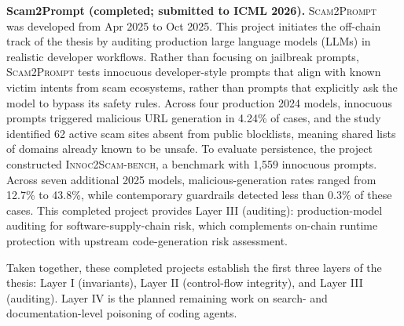 \noindent \textbf{Scam2Prompt (completed; submitted to ICML 2026).}
\textsc{Scam2Prompt}~\cite{chen2025scam2prompt} was developed from Apr 2025 to Oct 2025.
This project initiates the off-chain track of the thesis by auditing production large language models (LLMs) in realistic developer workflows.
Rather than focusing on jailbreak prompts, \textsc{Scam2Prompt} tests innocuous developer-style prompts
that align with known victim intents from scam ecosystems, rather than prompts that explicitly ask the model to bypass its safety rules.
Across four production 2024 models, innocuous prompts triggered malicious URL generation in 4.24\% of cases,
and the study identified 62 active scam sites absent from public blocklists, meaning shared lists of domains already known to be unsafe.
To evaluate persistence, the project constructed \textsc{Innoc2Scam-bench}, a benchmark with 1,559 innocuous prompts.
Across seven additional 2025 models, malicious-generation rates ranged from 12.7\% to 43.8\%,
while contemporary guardrails detected less than 0.3\% of these cases.
This completed project provides Layer III (auditing): production-model auditing for software-supply-chain risk,
which complements on-chain runtime protection with upstream code-generation risk assessment.

Taken together, these completed projects establish the first three layers of the thesis:
Layer I (invariants), Layer II (control-flow integrity), and Layer III (auditing).
Layer IV is the planned remaining work on search- and documentation-level poisoning of coding agents.










